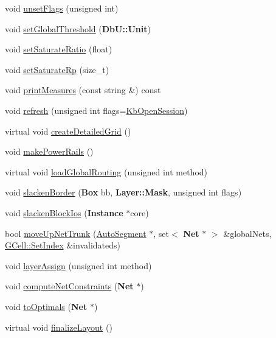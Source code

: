 \begin{DoxyCompactItemize}
\item 
void \hyperlink{classKatabatic_1_1KatabaticEngine_a1a6fac115cb81db48e3ac9ffa0721bb5}{unset\-Flags} (unsigned int)
\item 
void \hyperlink{classKatabatic_1_1KatabaticEngine_a1bd1e0104b73d4c558b0e121002796a6}{set\-Global\-Threshold} ({\bf Db\-U\-::\-Unit})
\item 
void \hyperlink{classKatabatic_1_1KatabaticEngine_ac2b780e06975ce8a0d6ca96f20cb971f}{set\-Saturate\-Ratio} (float)
\item 
void \hyperlink{classKatabatic_1_1KatabaticEngine_ade227e828b8c8fbfce478e353ca3ca59}{set\-Saturate\-Rp} (size\-\_\-t)
\item 
void \hyperlink{classKatabatic_1_1KatabaticEngine_a1b196d124bb66595a760ccc9b901d78b}{print\-Measures} (const string \&) const 
\item 
void \hyperlink{classKatabatic_1_1KatabaticEngine_a1e9bb62be35c6a415a1950c72c1964ef}{refresh} (unsigned int flags=\hyperlink{namespaceKatabatic_a2af2ad6b6441614038caf59d04b3b217af314588109fcc5f5ee1c42e5fd4d0ed5}{Kb\-Open\-Session})
\item 
virtual void \hyperlink{classKatabatic_1_1KatabaticEngine_a1b7d8ed09a198f7afd6e3ac911f6eb37}{create\-Detailed\-Grid} ()
\item 
void \hyperlink{classKatabatic_1_1KatabaticEngine_aaba3b9450c85634131146fb507089f2d}{make\-Power\-Rails} ()
\item 
virtual void \hyperlink{classKatabatic_1_1KatabaticEngine_a583925cfe4bbadcc1c24fe619debce09}{load\-Global\-Routing} (unsigned int method)
\item 
void \hyperlink{classKatabatic_1_1KatabaticEngine_a145b36b18fc9149980c5d6bd4bd10e0d}{slacken\-Border} ({\bf Box} bb, {\bf Layer\-::\-Mask}, unsigned int flags)
\item 
void \hyperlink{classKatabatic_1_1KatabaticEngine_ac40754d4a9bd0cf327b5fa088e993897}{slacken\-Block\-Ios} ({\bf Instance} $\ast$core)
\item 
bool \hyperlink{classKatabatic_1_1KatabaticEngine_abb2b28adfaca2cc36716db41b093f355}{move\-Up\-Net\-Trunk} (\hyperlink{classKatabatic_1_1AutoSegment}{Auto\-Segment} $\ast$, set$<$ {\bf Net} $\ast$ $>$ \&global\-Nets, \hyperlink{classKatabatic_1_1GCell_aacb1c215b203bfba5729f135b3221d40}{G\-Cell\-::\-Set\-Index} \&invalidateds)
\item 
void \hyperlink{classKatabatic_1_1KatabaticEngine_a77833ce938a430785ba869eedbc2300c}{layer\-Assign} (unsigned int method)
\item 
void \hyperlink{classKatabatic_1_1KatabaticEngine_a6957a5830a4d6f1b2daf83a7d98df601}{compute\-Net\-Constraints} ({\bf Net} $\ast$)
\item 
void \hyperlink{classKatabatic_1_1KatabaticEngine_ad6b9f7d94ee4a88f12c485e48d1e644a}{to\-Optimals} ({\bf Net} $\ast$)
\item 
virtual void \hyperlink{classKatabatic_1_1KatabaticEngine_a468eddb683c04cfeea1c5124a39e1f86}{finalize\-Layout} ()
\end{DoxyCompactItemize}
